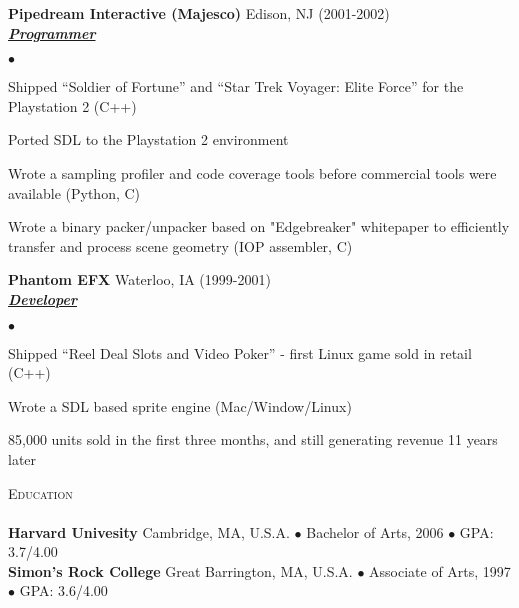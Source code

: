 \documentclass{article}
\newcommand{\lineunder}{\vspace*{-8pt} \\ \hspace*{-18pt} \hrulefill \\}
\newcommand{\header}[1]{{\hspace*{-15pt}\vspace*{6pt} \textsc{#1}} \vspace*{-6pt} \lineunder}
\newcommand{\employer}[4]{{ \textbf{#1} #2 (#3)\\ \underline{\textbf{\emph{#4}}}\\  }}
\newenvironment{achievements}{\begin{list}{$\bullet$}{\topsep 0pt \itemsep -2pt}}{\vspace*{4pt}\end{list}}
\newcommand{\school}[4]{
 \textbf{#1} #2 $\bullet$ #3 $\bullet$ #4\\
}
\begin{document}
	\employer{Pipedream Interactive (Majesco)} {Edison, NJ}	{2001-2002}	{Programmer}
	\begin{achievements}
	\item Shipped “Soldier of Fortune” and “Star Trek Voyager: Elite Force” for the Playstation 2 (C++)
	\item Ported SDL to the Playstation 2 environment
	\item Wrote a sampling profiler and code coverage tools before commercial tools were available (Python, C)
	\item Wrote a binary packer/unpacker based on "Edgebreaker" whitepaper to efficiently transfer  and process scene geometry (IOP assembler, C)
	\end{achievements}
	
	\employer{Phantom EFX} {Waterloo, IA} {1999-2001}	{Developer}
	\begin{achievements}
	\item Shipped “Reel Deal Slots and Video Poker”  - first Linux game sold in retail (C++)
	\item Wrote a SDL based sprite engine (Mac/Window/Linux)
	\item 85,000 units sold in the first three months, and still generating revenue 11 years later
	\end{achievements}

\header{Education}

\school{Harvard Univesity}{Cambridge, MA, U.S.A.}{Bachelor of Arts, 2006}{GPA: 3.7/4.00}
\school{Simon's Rock College}{Great Barrington, MA, U.S.A.}{Associate of Arts, 1997}{GPA: 3.6/4.00}
\end{document}
